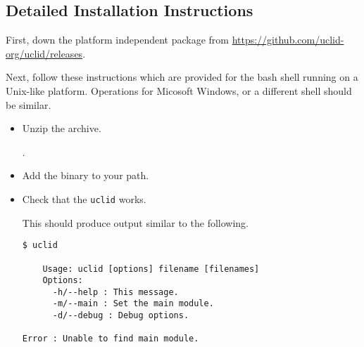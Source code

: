 \subsection{Detailed Installation Instructions}

First, down the platform independent package from \url{https://github.com/uclid-org/uclid/releases}.

Next, follow these instructions which are provided for the bash shell running on a Unix-like platform. Operations for Micosoft Windows, or a different shell should be similar.

\begin{itemize}
  \item Unzip the archive.

  .

\begin{comment}
  This should produce output similar to the following.
\begin{Verbatim}[frame=single]
Archive:  uclid-0.9.zip
  inflating: uclid-0.9/lib/default.uclid-0.9.jar  
  inflating: uclid-0.9/lib/com.microsoft.z3.jar  
  inflating: uclid-0.9/lib/org.scala-lang.scala-library-2.12.0.jar  
  inflating: uclid-0.9/lib/org.scala-lang.modules.scala-parser-combinators_2.12-1.0.6.jar  
  inflating: uclid-0.9/lib/org.scalactic.scalactic_2.12-3.0.1.jar  
  inflating: uclid-0.9/lib/org.scala-lang.scala-reflect-2.12.0.jar  
  inflating: uclid-0.9/bin/uclid     
  inflating: uclid-0.9/bin/uclid.bat  
\end{Verbatim}
\end{comment}


  \item Add the  binary to your path.


  \item Check that the \texttt{uclid} works.


  This should produce output similar to the following.
\begin{Verbatim}[frame=single, samepage=true]
$ uclid

    Usage: uclid [options] filename [filenames]
    Options:
      -h/--help : This message.
      -m/--main : Set the main module.
      -d/--debug : Debug options.
  
Error : Unable to find main module.
\end{Verbatim}
\end{itemize}


